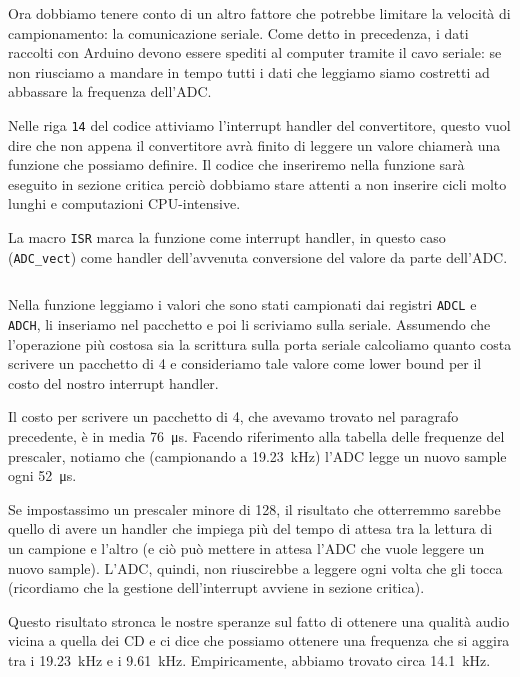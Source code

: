 \documentclass[a4paper,11pt]{article}
\newcommand\source[2]{
	\inputminted[fontsize=\footnotesize,linenos=true,tabsize=4]{#1}{#2}
}
\begin{document}
Ora dobbiamo tenere conto di un altro fattore che potrebbe limitare la velocità di campionamento: la comunicazione seriale. Come detto in precedenza, i dati raccolti con Arduino devono essere spediti al computer tramite il cavo seriale: se non riusciamo a mandare in tempo tutti i dati che leggiamo siamo costretti ad abbassare la frequenza dell'ADC.

Nelle riga \texttt{14} del codice attiviamo l'interrupt handler del convertitore, questo vuol dire che non appena il convertitore avrà finito di leggere un valore chiamerà una funzione che possiamo definire. Il codice che inseriremo nella funzione sarà eseguito in sezione critica perciò dobbiamo stare attenti a non inserire cicli molto lunghi e computazioni CPU-intensive.

La macro \texttt{ISR} marca la funzione come interrupt handler, in questo caso (\texttt{ADC\_vect}) come handler dell'avvenuta conversione del valore da parte dell'ADC.

\source{cpp}{adc_interrupt_rel}

Nella funzione leggiamo i valori che sono stati campionati dai registri \texttt{ADCL} e \texttt{ADCH}, li inseriamo nel pacchetto e poi li scriviamo sulla seriale. Assumendo che l'operazione più costosa sia la scrittura sulla porta seriale calcoliamo quanto costa scrivere un pacchetto di \SI{4}{\byte} e consideriamo tale valore come lower bound per il costo del nostro interrupt handler.

Il costo per scrivere un pacchetto di \SI{4}{\byte}, che avevamo trovato nel paragrafo precedente, è in media \SI{76}{\micro\second}. Facendo riferimento alla tabella delle frequenze del prescaler, notiamo che (campionando a \SI{19.23}{\kilo\hertz}) l'ADC legge un nuovo sample ogni \SI{52}{\micro\second}.

Se impostassimo un prescaler minore di \num{128}, il risultato che otterremmo sarebbe quello di avere un handler che impiega più del tempo di attesa tra la lettura di un campione e l'altro (e ciò può mettere in attesa l'ADC che vuole leggere un nuovo sample). L'ADC, quindi, non riuscirebbe a leggere ogni volta che gli tocca (ricordiamo che la gestione dell'interrupt avviene in sezione critica).

Questo risultato stronca le nostre speranze sul fatto di ottenere una qualità audio vicina a quella dei CD e ci dice che possiamo ottenere una frequenza che si aggira tra i \SI{19.23}{\kilo\hertz} e i \SI{9.61}{\kilo\hertz}. Empiricamente, abbiamo trovato circa \SI{14.1}{\kilo\hertz}.
\end{document}
